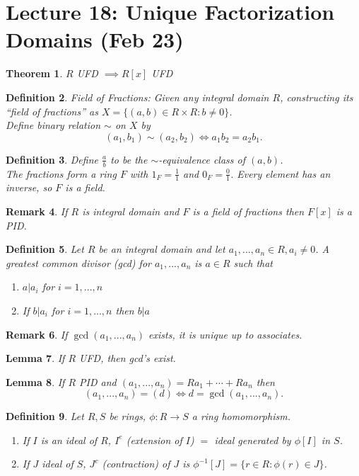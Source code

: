 \documentclass[a4paper,12pt]{article}
\newtheorem{thm}{Theorem}[section]
\newtheorem{lem}[thm]{Lemma}
\newtheorem{defn}[thm]{Definition}
\newtheorem{rmk}[thm]{Remark}
\begin{document}
\section{Lecture 18: Unique Factorization Domains (Feb 23)}
\begin{thm}
    $R$ UFD $\implies R[x]$ UFD
\end{thm}
\begin{defn}
    Field of Fractions: Given any integral domain $R$, constructing its ``field of fractions'' as $X= \{(a,b)\in R\times R: b\neq 0\}$. \\
    Define binary relation $\sim$ on $X$ by \[
    (a_1,b_1)\sim (a_2,b_2) \iff a_1b_2=a_2b_1
    .\] 
\end{defn}
\begin{defn}
    Define $\frac{a}{b}$ to be the $\sim$-equivalence class of $(a,b)$. \\
    The fractions form a ring $F$ with $1_F=\frac{1}{1}$ and $0_F=\frac{0}{1}$. Every element has an inverse, so $F$ is a field. 
\end{defn}
\begin{rmk}
    If $R$ is integral domain and $F$ is a field of fractions then $F[x]$ is a PID.
\end{rmk}
\begin{defn}
    Let $R$ be an integral domain and let $a_1,...,a_n\in R,a_i\neq 0$. A greatest common divisor (gcd) for $a_1,...,a_n$ is $a\in R$ such that 
    \begin{enumerate}
        \item $a | a_i$ for $i=1,...,n$
        \item If $b|a_i$ for $i=1,...,n$ then $b|a$
    \end{enumerate}
\end{defn}
\begin{rmk}
    If $\gcd(a_1,...,a_n)$ exists, it is unique up to associates. 
\end{rmk}
\begin{lem}
    If $R$ UFD, then gcd's exist.
\end{lem}
\begin{lem}
    If $R$ PID and $(a_1,...,a_n)=Ra_1+\cdots+Ra_n$ then \[
        (a_1,...,a_n)=(d)\iff d=\gcd(a_1,...,a_n)
    .\]
\end{lem}
\begin{defn}
    Let $R,S$ be rings, $\phi:R\to S$ a ring homomorphism.
    \begin{enumerate}
        \item If $I$ is an ideal of $R$, $I^e$ (extension of $I$) $=$ ideal generated by $\phi[I]$ in $S$. 
        \item If $J$ ideal of $S$, $J^c$ (contraction) of $J$ is $\phi^{-1}[J]= \{r\in R: \phi(r)\in J\}$. 
    \end{enumerate}
\end{defn}
\end{document}

